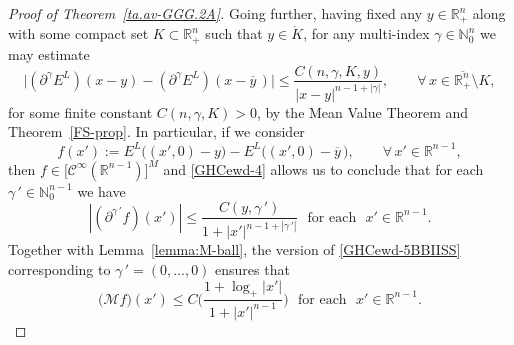 \documentclass[11pt,reqno]{amsart}
\numberwithin{equation}{section}
\theoremstyle{remark}
\begin{document}
\begin{proof}[Proof of Theorem~\ref{ta.av-GGG.2A}]
Going further, having fixed any $y\in{\mathbb{R}}^n_{+}$ along with some compact 
set $K\subset{\mathbb{R}}^n_{+}$ such that $y\in{\mathring{K}}$, for any multi-index 
$\gamma\in{\mathbb{N}}^n_0$ we may estimate 
%
\begin{equation}\label{GHCewd-4}
\big|(\partial^\gamma E^{L})(x-y)-(\partial^\gamma E^L)(x-\overline{y}\,)\big|
\leq\frac{C(n,\gamma,K,y)}{|x-y|^{n-1+|\gamma|}},\qquad\forall\,x\in\overline{{\mathbb{R}}^n_{+}}\setminus K,
\end{equation}
%
for some finite constant $C(n,\gamma,K)>0$, by the Mean Value Theorem and Theorem~\ref{FS-prop}. 
In particular, if we consider 
%
\begin{equation}\label{GHCewd-5}
f(x'):=E^{L}\big((x',0)-y\big)-E^{L}\big((x',0)-\overline{y}\,\big),\qquad\forall\,x'\in{\mathbb{R}}^{n-1},
\end{equation}
%
then $f\in\big[{\mathscr{C}}^\infty({\mathbb{R}}^{n-1})\big]^{M}$ and \eqref{GHCewd-4} allows us 
to conclude that for each $\gamma\,'\in{\mathbb{N}}_0^{n-1}$ we have
%
\begin{equation}\label{GHCewd-5BBIISS}
|(\partial^{\gamma\,'}f)(x')|\leq\frac{C(y,\gamma\,')}{1+|x'|^{n-1+|\gamma\,'|}}
\,\,\text{ for each }\,\,x'\in{\mathbb{R}}^{n-1}.
\end{equation}
%
Together with Lemma~\ref{lemma:M-ball}, the version of \eqref{GHCewd-5BBIISS} corresponding 
to $\gamma\,'=(0,\dots,0)$ ensures that 
%
\begin{equation}\label{GHCewd-5BB-trr}
\big({\mathcal{M}}f\big)(x')\leq C\Big(\frac{1+\log_{+}|x'|}{1+|x'|^{n-1}}\Big)
\,\,\text{ for each }\,\,x'\in{\mathbb{R}}^{n-1}.
\end{equation}


\end{proof}
\end{document}
